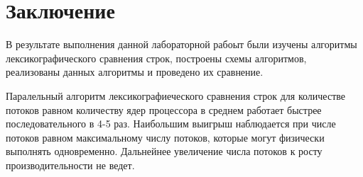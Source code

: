 \chapter*{Заключение}

    В результате выполнения данной лабораторной рабоыт были изучены алгоритмы лексикографического сравнения строк, построены схемы алгоритмов, реализованы данных алгоритмы и проведено их сравнение.
    
    Паралельный алгоритм лексикографиеческого сравнения строк для количестве потоков равном количеству ядер процессора в среднем работает быстрее последовательного в 4-5 раз. Наибольшим выигрыш наблюдается при числе потоков равном максимальному числу потоков, которые могут физически выполнять одновременно. Дальнейнее увеличение числа потоков к росту производительности не ведет.
